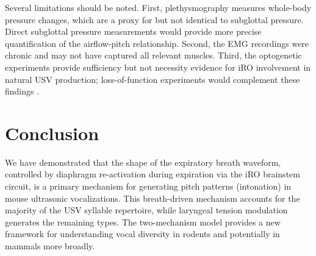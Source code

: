 \documentclass[11pt]{article}
\begin{document}
Several limitations should be noted. First, plethysmography measures whole-body pressure changes, which are a proxy for but not identical to subglottal pressure. Direct subglottal pressure measurements would provide more precise quantification of the airflow-pitch relationship. Second, the EMG recordings were chronic and may not have captured all relevant muscles. Third, the optogenetic experiments provide sufficiency but not necessity evidence for iRO involvement in natural USV production; loss-of-function experiments would complement these findings \citep{tschida2019}.

\section{Conclusion}

We have demonstrated that the shape of the expiratory breath waveform, controlled by diaphragm re-activation during expiration via the iRO brainstem circuit, is a primary mechanism for generating pitch patterns (intonation) in mouse ultrasonic vocalizations. This breath-driven mechanism accounts for the majority of the USV syllable repertoire, while laryngeal tension modulation generates the remaining types. The two-mechanism model provides a new framework for understanding vocal diversity in rodents and potentially in mammals more broadly.



\end{document}

